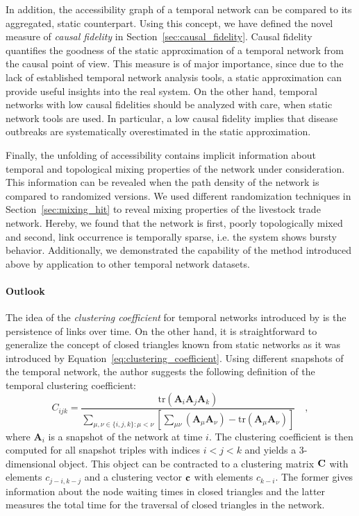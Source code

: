 In addition, the accessibility graph of a temporal network can be compared to its aggregated, static counterpart.
Using this concept, we have defined the novel measure of \emph{causal fidelity} in Section~\ref{sec:causal_fidelity}.
Causal fidelity quantifies the goodness of the static approximation of a temporal network from the causal point of view.
This measure is of major importance, since due to the lack of established temporal network analysis tools, a static approximation can provide useful insights into the real system.
On the other hand, temporal networks with low causal fidelities should be analyzed with care, when static network tools are used.
In particular, a low causal fidelity implies that disease outbreaks are systematically overestimated in the static approximation.

Finally, the unfolding of accessibility contains implicit information about temporal and topological mixing properties of the network under consideration.
This information can be revealed when the path density of the network is compared to randomized versions.
We used different randomization techniques in Section~\ref{sec:mixing_hit} to reveal mixing properties of the livestock trade network.
Hereby, we found that the network is first, poorly topologically mixed and second, link occurrence is temporally sparse, i.e. the system shows bursty behavior.
Additionally, we demonstrated the capability of the method introduced above by application to other temporal network datasets.


\paragraph{Outlook\color{Cayenne}{.}}
The idea of the \emph{clustering coefficient} for temporal networks introduced by \citet{Tang:2010dn} is the persistence of links over time.
On the other hand, it is straightforward to generalize the concept of closed triangles known from static networks as it was introduced by Equation~\eqref{eq:clustering_coefficient}.
Using different snapshots of the temporal network, the author suggests the following definition of the temporal clustering coefficient:
\[
C_{ijk}=\frac{\text{tr} (\mathbf{A}_{i}\mathbf{A}_{j}\mathbf{A}_{k})}{\sum_{\mu,\nu\in\{i,j,k\}:\mu<\nu}\left[\sum _{\mu \nu }\left(\mathbf{A}_{\mu}\mathbf{A}_{\nu}\right)-\text{tr}\left(\mathbf{A}_{\mu}\mathbf{A}_{\nu}\right)\right]} \quad ,
\]
where $\mathbf{A}_i$ is a snapshot of the network at time $i$.
The clustering coefficient is then computed for all snapshot triples with indices $i<j<k$ and yields a 3-dimensional object.
This object can be contracted to a clustering matrix $\mathbf{C}$ with elements $c_{j-i,k-j}$ and a clustering vector $\mathbf{c}$ with elements $c_{k-i}$.
The former gives information about the node waiting times in closed triangles and the latter measures the total time for the traversal of closed triangles in the network.


